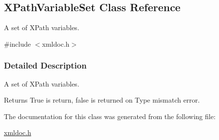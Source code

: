 \hypertarget{classXPathVariableSet}{
\subsection{XPathVariableSet Class Reference}
\label{classXPathVariableSet}
}


A set of XPath variables.  




{\ttfamily \#include $<$xmldoc.h$>$}



\subsubsection{Detailed Description}
A set of XPath variables. \begin{DoxyReturn}{Returns}
True is return, false is returned on Type mismatch error. 
\end{DoxyReturn}


The documentation for this class was generated from the following file:\begin{DoxyCompactItemize}
\item 
\hyperlink{xmldoc_8h}{xmldoc.h}\end{DoxyCompactItemize}
